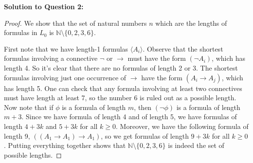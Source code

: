 \documentclass{article}
\begin{document}
\textbf{Solution to Question 2:}
\begin{proof}
We show that the set of natural numbers \(n\) which are the lengths of formulas in \(L_0\) is \( \mathbb{N} \setminus \{0, 2, 3, 6\} \).

First note that we have length-1 formulas \(\langle A_i \rangle\). Observe that the shortest formulas involving a connective \(\neg\) or \(\to\) must have the form \((\neg A_i)\), which has length 4. So it’s clear that there are no formulas of length 2 or 3. The shortest formulas involving just one occurrence of \(\to\) have the form \((A_i \to A_j)\), which has length 5. One can check that any formula involving at least two connectives must have length at least 7, so the number 6 is ruled out as a possible length. Now note that if \(\phi\) is a formula of length \(m\), then \((\neg \phi)\) is a formula of length \(m + 3\). Since we have formula of length 4 and of length 5, we have formulas of length \(4 + 3k\) and \(5 + 3k\) for all \(k \geq 0\). Moreover, we have the following formula of length 9, \(((A_1 \to A_1) \to A_1)\), so we get formulas of length \(9 + 3k\) for all \(k \geq 0\). Putting everything together shows that \( \mathbb{N} \setminus \{0, 2, 3, 6\} \) is indeed the set of possible lengths.
\end{proof}
\end{document}
